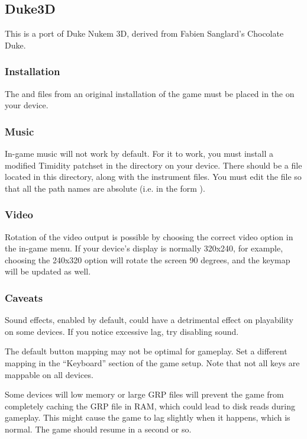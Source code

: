 \subsection{Duke3D}

This is a port of Duke Nukem 3D, derived from Fabien Sanglard's
Chocolate Duke.

\subsubsection{Installation}
The  and  files from an original installation of
  the game must be placed in the  on your
  device.

\subsubsection{Music}
In-game music will not work by default. For it to work, you must
install a modified Timidity patchset in the
 directory on your device. There should be
a  file located in this
directory, along with the instrument files. You must edit the
 file so that all the path names are absolute (i.e. in the
form ).

\subsubsection{Video}
Rotation of the video output is possible by choosing the correct video
option in the in-game menu. If your device's display is normally
320x240, for example, choosing the 240x320 option will rotate the
screen 90 degrees, and the keymap will be updated as well.

\subsubsection{Caveats}
Sound effects, enabled by default, could have a detrimental effect on
playability on some devices. If you notice excessive lag, try
disabling sound.

The default button mapping may not be optimal for gameplay. Set a
different mapping in the ``Keyboard'' section of the game setup. Note
that not all keys are mappable on all devices.

Some devices will low memory or large GRP files will prevent the game
from completely caching the GRP file in RAM, which could lead to disk
reads during gameplay. This might cause the game to lag slightly when
it happens, which is normal. The game should resume in a second or so.
